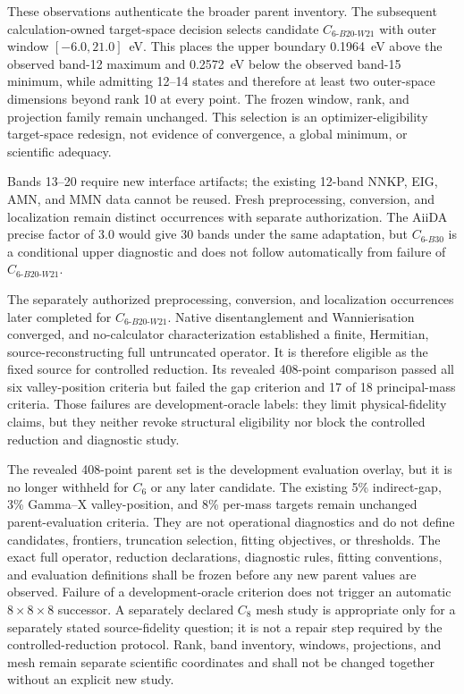 \documentclass[11pt]{report}
\begin{document}
These observations authenticate the broader parent inventory.  The subsequent
calculation-owned target-space decision selects candidate
$C_{6\text{-}B20\text{-}W21}$ with outer window $[-6.0,21.0]$~eV.  This places the
upper boundary 0.1964~eV above the observed band-12 maximum and 0.2572~eV below the
observed band-15 minimum, while admitting 12--14 states and therefore at least two
outer-space dimensions beyond rank 10 at every point.  The frozen window, rank, and
projection family remain unchanged.  This selection is an optimizer-eligibility
target-space redesign, not evidence of convergence, a global minimum, or scientific
adequacy.

Bands 13--20 require new interface artifacts; the existing 12-band NNKP, EIG, AMN, and
MMN data cannot be reused.  Fresh preprocessing, conversion, and localization remain
distinct occurrences with separate authorization.  The AiiDA precise factor of 3.0
would give 30 bands under the same adaptation, but $C_{6\text{-}B30}$ is a conditional
upper diagnostic and does not follow automatically from failure of
$C_{6\text{-}B20\text{-}W21}$.

The separately authorized preprocessing, conversion, and localization occurrences later
completed for $C_{6\text{-}B20\text{-}W21}$.  Native disentanglement and
Wannierisation converged, and no-calculator characterization established a finite,
Hermitian, source-reconstructing full untruncated operator.  It is therefore eligible as
the fixed source for controlled reduction.  Its revealed 408-point comparison passed
all six valley-position criteria but failed the gap criterion and 17 of 18
principal-mass criteria.  Those failures are development-oracle labels: they limit
physical-fidelity claims, but they neither revoke structural eligibility nor block the
controlled reduction and diagnostic study.

The revealed 408-point parent set is the development evaluation overlay, but it is no
longer withheld for $C_6$ or any later candidate.  The existing 5\% indirect-gap, 3\%
Gamma--X valley-position, and 8\% per-mass targets remain unchanged parent-evaluation
criteria.  They are not operational diagnostics and do not define candidates,
frontiers, truncation selection, fitting objectives, or thresholds.  The exact full
operator, reduction declarations, diagnostic rules, fitting conventions, and evaluation
definitions shall be frozen before any new parent values are observed.  Failure of a
development-oracle criterion
does not trigger an automatic $8\times8\times8$ successor.  A separately declared
$C_8$ mesh study is appropriate only for a separately stated source-fidelity question;
it is not a repair step required by the controlled-reduction protocol.  Rank, band
inventory, windows, projections, and mesh remain separate scientific coordinates and
shall not be changed together without an explicit new study.
\end{document}
